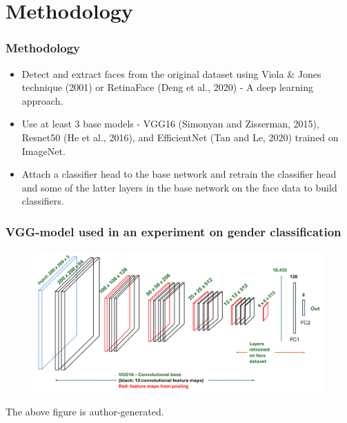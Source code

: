 \documentclass[aspectratio=169]{beamer}
\begin{document}
\section{Methodology}
\begin{frame}
\frametitle{Methodology}
\begin{exampleblock}{}
  \begin{itemize}
  \setlength\itemsep{1em} 
    \item Detect and extract faces from the original dataset using Viola \& Jones technique (2001) or RetinaFace (Deng et al., 2020) - A deep learning approach.
    \item Use at least 3 base models - VGG16 (Simonyan and Zisserman, 2015), Resnet50 (He et al., 2016), and EfficientNet (Tan and Le, 2020) trained on ImageNet.
    \item Attach a classifier head to the base network and retrain the classifier head and some of the latter layers in the base network on the face data to build classifiers.
  \end{itemize}
\end{exampleblock}
\end{frame}

\begin{frame}
\frametitle{VGG-model used in an experiment on gender classification}
\begin{figure}
    \centering
    \includegraphics[scale=0.40]{fig4_VGGmodel.png}
    \label{fig4}
\end{figure}
The above figure is author-generated.
\end{frame}
\end{document}
